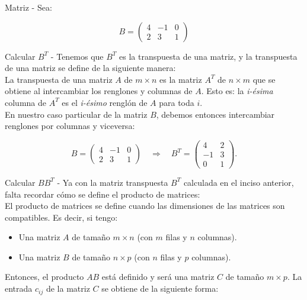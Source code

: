 \documentclass[11pt,letterpaper]{article}
\begin{document}
\begin{inciso}{Matriz}
- Sea: 

\[ B = \begin{pmatrix} 4 & -1 & 0 \\ 2 & 3 & 1 \end{pmatrix} \]
 
\begin{problem}{Calcular \( B^T \)}
- Tenemos que $B^T$ es la transpuesta de una matriz, y la transpuesta de una matriz se define de la siguiente manera: \\
La transpuesta de una matriz $A$ de $m \times n$ es la matriz $A^T$ de $n \times m$ que se obtiene al intercambiar los renglones y columnas de $A$. Esto es: la \textit{i-ésima} columna de $A^T$ es el \textit{i-ésimo} renglón de $A$ para toda $i$. \\
En nuestro caso particular de la matriz $B$, debemos entonces intercambiar renglones por columnas y viceversa: 

\begin{equation*}
    B = \begin{pmatrix} 4 & -1 & 0 \\ 2 & 3 & 1 \end{pmatrix} \quad \Rightarrow \quad B^T = \begin{pmatrix} 4 & 2 \\ -1 & 3 \\ 0 & 1\end{pmatrix}.
\end{equation*}
\end{problem}

\begin{problem}{Calcular \( BB^T \)}
-
Ya con la matriz transpuesta $B^T$ calculada en el inciso anterior, falta recordar cómo se define el producto de matrices: \\

El producto de matrices se define cuando las dimensiones de las matrices son compatibles. Es decir, si tengo:

\begin{itemize}
    \item Una matriz \( A \) de tamaño \( m \times n \) (con \( m \) filas y \( n \) columnas).
    \item Una matriz \( B \) de tamaño \( n \times p \) (con \( n \) filas y \( p \) columnas).
\end{itemize}


Entonces, el producto \( AB \) está definido y será una matriz \( C \) de tamaño \( m \times p \). La entrada \( c_{ij} \) de la matriz \( C \) se obtiene de la siguiente forma:


\end{problem}
\end{inciso}
\end{document}

